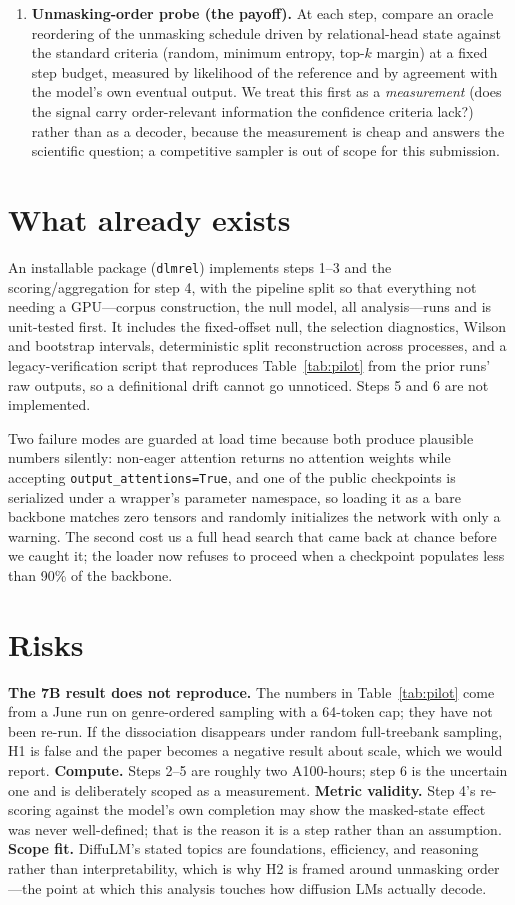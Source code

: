 \documentclass{article}
\begin{document}
\begin{enumerate}
\item \textbf{Unmasking-order probe (the payoff).} At each step, compare an
oracle reordering of the unmasking schedule driven by relational-head state
against the standard criteria (random, minimum entropy, top-$k$ margin) at a
fixed step budget, measured by likelihood of the reference and by agreement with
the model's own eventual output. We treat this first as a \emph{measurement}
(does the signal carry order-relevant information the confidence criteria lack?)
rather than as a decoder, because the measurement is cheap and answers the
scientific question; a competitive sampler is out of scope for this submission.
\end{enumerate}

\section{What already exists}

An installable package (\texttt{dlmrel}) implements steps 1--3 and the
scoring/aggregation for step 4, with the pipeline split so that everything not
needing a GPU---corpus construction, the null model, all analysis---runs and is
unit-tested first. It includes the fixed-offset null, the selection diagnostics,
Wilson and bootstrap intervals, deterministic split reconstruction across
processes, and a legacy-verification script that reproduces Table~\ref{tab:pilot}
from the prior runs' raw outputs, so a definitional drift cannot go unnoticed.
Steps 5 and 6 are not implemented.

Two failure modes are guarded at load time because both produce plausible
numbers silently: non-eager attention returns no attention weights while
accepting \texttt{output\_attentions=True}, and one of the public checkpoints is
serialized under a wrapper's parameter namespace, so loading it as a bare
backbone matches zero tensors and randomly initializes the network with only a
warning. The second cost us a full head search that came back at chance before
we caught it; the loader now refuses to proceed when a checkpoint populates less
than 90\% of the backbone.

\section{Risks}

\textbf{The 7B result does not reproduce.} The numbers in Table~\ref{tab:pilot}
come from a June run on genre-ordered sampling with a 64-token cap; they have
not been re-run. If the dissociation disappears under random full-treebank
sampling, H1 is false and the paper becomes a negative result about scale, which
we would report. \textbf{Compute.} Steps 2--5 are roughly two A100-hours; step 6
is the uncertain one and is deliberately scoped as a measurement.
\textbf{Metric validity.} Step 4's re-scoring against the model's own completion
may show the masked-state effect was never well-defined; that is the reason it
is a step rather than an assumption. \textbf{Scope fit.} DiffuLM's stated topics
are foundations, efficiency, and reasoning rather than interpretability, which is
why H2 is framed around unmasking order---the point at which this analysis
touches how diffusion LMs actually decode.
\end{document}
